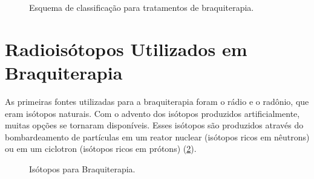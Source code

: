 \documentclass[11pt,a4paper]{article}
\begin{document}
	\begin{figure}[h]
		\centering
		\caption{Esquema de classificação para tratamentos de braquiterapia.}
		\label{fig:classificacoesBraqui}
	\end{figure}

	
\section{Radioisótopos Utilizados em Braquiterapia}

	As primeiras fontes utilizadas para a braquiterapia foram o rádio e o radônio, que eram isótopos naturais. Com o advento dos isótopos produzidos artificialmente, muitas opções se tornaram disponíveis. Esses isótopos são produzidos através do bombardeamento de partículas em um reator nuclear (isótopos ricos em nêutrons) ou em um ciclotron (isótopos ricos em prótons) (\ref{fig:isotoposUtilizadosEmBraqu}).

	\begin{figure}[!ht]
		\centering
		\caption{Isótopos para Braquiterapia.}
		\label{fig:isotoposUtilizadosEmBraqu}
	\end{figure}
	
\end{document}
